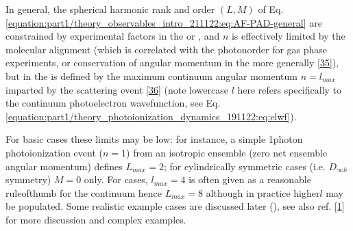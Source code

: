 \documentclass[letterpaper,table,10pt,english]{jupyterBook}
\begin{document}
\sphinxAtStartPar
In general, the spherical harmonic rank and order \((L,M)\) of Eq. \eqref{equation:part1/theory_observables_intro_211122:eq:AF-PAD-general} are constrained by experimental factors in the {\hyperref[\detokenize{backmatter/glossary:term-LF}]{}} or {\hyperref[\detokenize{backmatter/glossary:term-AF}]{}}, and \(n\) is effectively limited by the molecular alignment (which is correlated with the photon\sphinxhyphen{}order for gas phase experiments, or conservation of angular momentum in the {\hyperref[\detokenize{backmatter/glossary:term-LF}]{}} more generally {[}\hyperlink{cite.backmatter/bibliography:id814}{35}{]}), but in the {\hyperref[\detokenize{backmatter/glossary:term-MF}]{}} is defined by the maximum continuum angular momentum \(n=l_{max}\) imparted by the scattering event {[}\hyperlink{cite.backmatter/bibliography:id485}{36}{]} (note lower\sphinxhyphen{}case \(l\) here refers specifically to the continuum photoelectron wavefunction, see Eq. \eqref{equation:part1/theory_photoionization_dynamics_191122:eq:elwf}).

\sphinxAtStartPar
For basic cases these limits may be low: for instance, a simple 1\sphinxhyphen{}photon photoionization event (\(n=1\)) from an isotropic ensemble (zero net ensemble angular momentum) defines \(L_{max}=2\); for cylindrically symmetric cases (i.e. \(D_{\infty h}\) symmetry) \(M=0\) only. For {\hyperref[\detokenize{backmatter/glossary:term-MF}]{}} cases, \(l_{max}=4\) is often given as a reasonable rule\sphinxhyphen{}of\sphinxhyphen{}thumb for the continuum \sphinxhyphen{} hence \(L_{max}=8\) \sphinxhyphen{} although in practice higher\sphinxhyphen{}\(l\) may be populated. Some realistic example cases are discussed later (), see also ref. {[}\hyperlink{cite.backmatter/bibliography:id569}{1}{]} for more discussion and complex examples.
\end{document}
